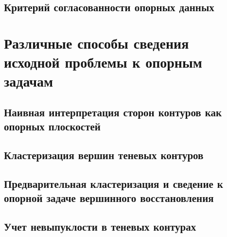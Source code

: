 \documentclass[a4paper, 12pt, titlepage]{article}
\theoremstyle{definition}
\theoremstyle{plain}
\theoremstyle{plain}
\begin{document}
\subsection{Критерий согласованности опорных данных}


\section{Различные способы сведения исходной проблемы к опорным задачам}

\subsection{Наивная интерпретация сторон контуров как опорных плоскостей}

\subsection{Кластеризация вершин теневых контуров}

\subsection{Предварительная кластеризация и сведение к опорной задаче
вершинного восстановления}

\subsection{Учет невыпуклости в теневых контурах}



\newpage


\end{document}
